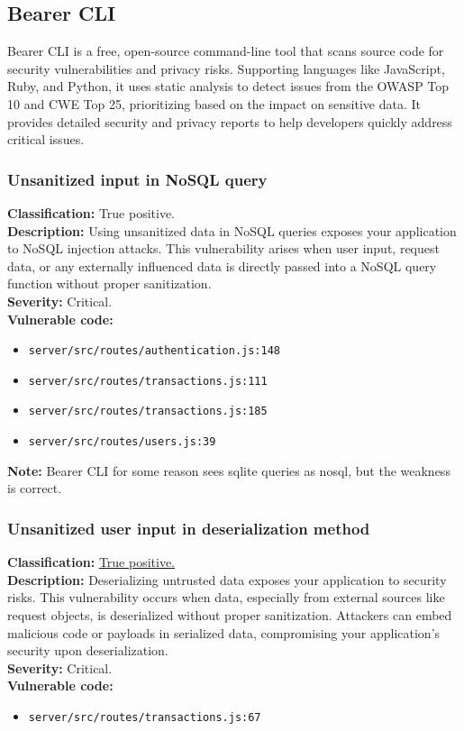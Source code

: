 \documentclass[]{article}
\begin{document}
\subsection{Bearer CLI}
Bearer CLI is a free, open-source command-line tool that scans source code for security vulnerabilities and privacy risks. Supporting languages like JavaScript, Ruby, and Python, it uses static analysis to detect issues from the OWASP Top 10 and CWE Top 25, prioritizing based on the impact on sensitive data. It provides detailed security and privacy reports to help developers quickly address critical issues.

\subsubsection{Unsanitized input in NoSQL query}
\textbf{Classification:} True positive. \\
\textbf{Description:} Using unsanitized data in NoSQL queries exposes your application to NoSQL injection attacks. This vulnerability arises when user input, request data, or any externally influenced data is directly passed into a NoSQL query function without proper sanitization. \\
\textbf{Severity:} Critical. \\ 
\textbf{Vulnerable code:}
\begin{itemize}
    \item \texttt{server/src/routes/authentication.js:148}
    \item \texttt{server/src/routes/transactions.js:111}
    \item \texttt{server/src/routes/transactions.js:185}
    \item \texttt{server/src/routes/users.js:39}
\end{itemize}
\textbf{Note:} Bearer CLI for some reason sees sqlite queries as nosql, but the weakness is correct.

\subsubsection{Unsanitized user input in deserialization method}
\textbf{Classification:} \hyperref[subsubsec:deserialization_of_untrusted_data]{True positive.} \\
\textbf{Description:} Deserializing untrusted data exposes your application to security risks. This vulnerability occurs when data, especially from external sources like request objects, is deserialized without proper sanitization. Attackers can embed malicious code or payloads in serialized data, compromising your application's security upon deserialization. \\ 
\textbf{Severity:} Critical. \\ 
\textbf{Vulnerable code:}
\begin{itemize}
    \item \texttt{server/src/routes/transactions.js:67}
\end{itemize}
\end{document}
